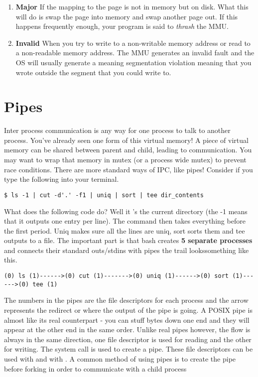 \begin{enumerate}
\begin{enumerate}
 \item \textbf{Major} If the mapping to the page is not in memory but on disk. What this will do is swap the page into memory and swap another page out. If this happens frequently enough, your program is said to \emph{thrash} the MMU.

 \item \textbf{Invalid} When you try to write to a non-writable memory address or read to a non-readable memory address. The MMU generates an invalid fault and the OS will usually generate a  meaning segmentation violation meaning that you wrote outside the segment that you could write to.
\end{enumerate}

\section{Pipes}

Inter process communication is any way for one process to talk to another process. You've already seen one form of this virtual memory! A piece of virtual memory can be shared between parent and child, leading to communication. You may want to wrap that memory in  mutex (or a process wide mutex) to prevent race conditions. There are more standard ways of IPC, like pipes! Consider if you type the following into your terminal.

\begin{verbatim}
$ ls -1 | cut -d'.' -f1 | uniq | sort | tee dir_contents
\end{verbatim}

What does the following code do? Well it 's the current directory (the -1 means that it outputs one entry per line). The  command then takes everything before the first period. Uniq makes sure all the lines are uniq, sort sorts them and tee outputs to a file. The important part is that bash creates \textbf{5 separate processes} and connects their standard outs/stdins with pipes the trail lookssomething like this.

\begin{verbatim}
(0) ls (1)------>(0) cut (1)------->(0) uniq (1)------>(0) sort (1)------>(0) tee (1)
\end{verbatim}

The numbers in the pipes are the file descriptors for each process and the arrow represents the redirect or where the output of the pipe is going. A POSIX pipe is almost like its real counterpart - you can stuff bytes down one end and they will appear at the other end in the same order. Unlike real pipes however, the flow is always in the same direction, one file descriptor is used for reading and the other for writing. The  system call is used to create a pipe. These file descriptors can be used with  and with . A common method of using pipes is to create the pipe before forking in order to communicate with a child process


\end{enumerate}
